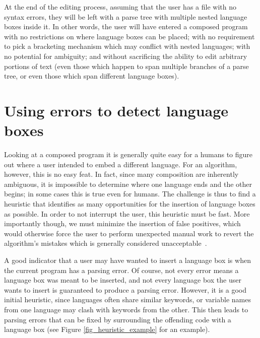\documentclass[sigplan,screen]{acmart}\settopmatter{printfolios=true,printccs=false,printacmref=false}
\begin{document}
At the end of the editing process, assuming that the user has a file with no syntax
errors, they will be left with a parse tree with multiple nested language boxes inside
it. In other words, the user will have entered a
composed program with no restrictions on where language boxes can be placed; with no
requirement to pick a bracketing mechanism which may conflict with nested
languages; with no potential for ambiguity; and without sacrificing the ability
to edit arbitrary portions of text (even those which happen to span multiple
branches of a parse tree, or even those which span different language boxes).

\section{Using errors to detect language boxes}
\label{sec_finding_lbox_candidates}

Looking at a composed program it is generally quite easy for a humans
to figure out where a user intended to embed a different
language. For an algorithm, however, this is no easy feat. In fact, since
many composition are inherently ambiguous, it is impossible to determine
where one language ends and the other begins; in some cases this is true
even for humans. The challenge is thus to find a heuristic that identifies as many
opportunities for the insertion of language boxes as possible. In order to not
interrupt the user, this heuristic must be fast. More importantly though, we
must minimize the insertion of false positives, which would otherwise force the
user to perform unexpected manual work to revert the algorithm's mistakes which
is generally considered
unacceptable~\cite{vanter00displaying,lewis95designing,vanter94practical}.

A good indicator that a user may have wanted to insert a language box is when
the current program has a parsing error. Of course, not every error means a
language box was meant to be inserted, and not every language box the user
wants to insert is guaranteed to produce a parsing error. However, it is a good
initial heuristic, since languages often share similar keywords, or variable
names from one language may clash with keywords from the other.  This then
leads to parsing errors that can be fixed by surrounding the offending code
with a language box (see Figure \ref{fig_heuristic_example} for an example).
\end{document}
